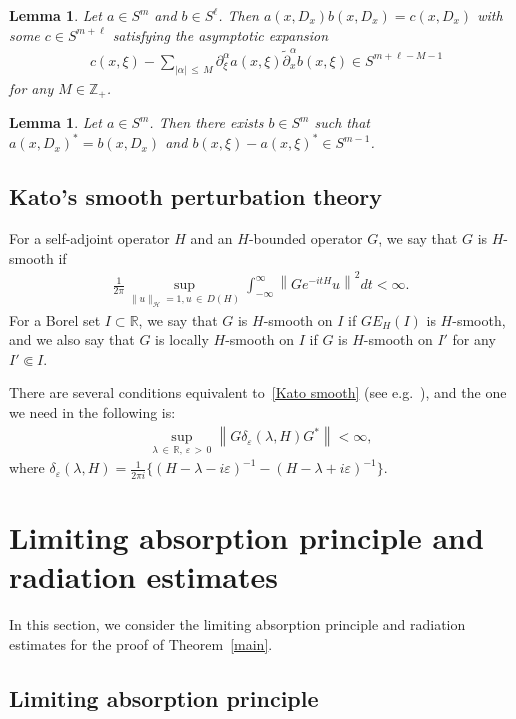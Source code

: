 \documentclass[10pt]{amsart}
\newtheorem{lemm}[theo]{Lemma}\newtheorem{prop}[theo]{Proposition}\newtheorem{coro}[theo]{Corollary}\newtheorem{conj}[theo]{Conjecture}
\theoremstyle{definition}\newtheorem{defi}[theo]{Definition}\newtheorem{rema}[theo]{Remark}\newtheorem{exam}[theo]{Example}\newtheorem{exem}[theo]{Example}\newtheorem{nota}[theo]{Notation}
\renewcommand{\a}{\alpha}
\renewcommand{\d}{\delta}
\newcommand{\e}{\varepsilon}
\newcommand{\x}{\xi}
\newcommand{\R}{\mathbb{R}}
\newcommand{\Z}{\mathbb{Z}}
\newcommand{\HS}{\mathcal{H}}
\begin{document}
\begin{lemm}\label{composition lemma}
Let $a\in S^m$ and $b\in S^{\ell}$. Then $a(x,D_x)b(x,D_x)=c(x,D_x)$ with some $c\in S^{m+\ell}$ satisfying the asymptotic expansion
\begin{align*}
&c(x,\x) - \sum_{|\a|\,\leq\,M} \partial_{\x}^\a a(x,\x) \tilde\partial_{x}^\a b(x,\x) \in S^{m+\ell-M-1}
\end{align*}
for any $M\in\Z_+$.
\end{lemm}

\begin{lemm}\label{adjoint lemma}
Let $a\in S^m$. Then there exists $b\in S^m$ such that $a(x,D_x)^*=b(x,D_x)$ and $b(x,\x) - a(x,\x)^* \in S^{m-1}$.
\end{lemm}


\subsection{Kato's smooth perturbation theory} For a self-adjoint operator $H$ and an $H$-bounded operator $G$, we say that $G$ is $H$-smooth if
\begin{align}\label{Kato smooth}
\frac{1}{2\pi}\sup_{\|u\|_{\HS}=1,u\,\in\,D(H)} \int_{-\infty}^\infty \left\| Ge^{-itH}u \right\|^2 dt < \infty.
\end{align}
For a Borel set $I\subset\R$, we say that $G$ is $H$-smooth on $I$ if $GE_H(I)$ is $H$-smooth, and we also say that $G$ is locally $H$-smooth on $I$ if $G$ is $H$-smooth on $I'$ for any $I' \Subset I$.

There are several conditions equivalent to~\eqref{Kato smooth} (see e.g.~\cite{Yg}), and the one we need in the following is:
\begin{align}\label{Kato smooth 2}
\sup_{\lambda\,\in\,\R,\,\e\,>\,0} \left\|G\d_\e(\lambda,H)G^*\right\| <\infty,
\end{align}
where $\d_\e(\lambda,H)=\frac{1}{2\pi i}\{(H-\lambda-i\e)^{-1}-(H-\lambda+i\e)^{-1}\}$.


\section{Limiting absorption principle and radiation estimates}\label{Mourre section}

In this section, we consider the limiting absorption principle and radiation estimates for the proof of Theorem~\ref{main}.


\subsection{Limiting absorption principle}
\end{document}
